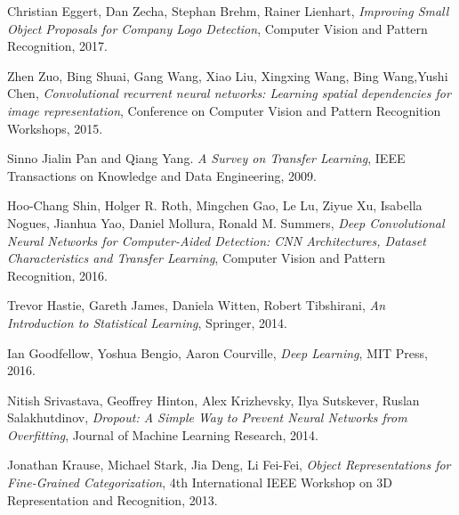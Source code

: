 \documentclass [11pt,letterpaper ,twoside ,openany ]{report}
\begin{document}
\begin{thebibliography}{9}
          Christian Eggert, Dan Zecha, Stephan Brehm, Rainer Lienhart,
          \textit{Improving Small Object Proposals for Company Logo Detection},
          Computer Vision and Pattern Recognition,
          2017.                              

          Zhen Zuo, Bing Shuai, Gang Wang, Xiao Liu, Xingxing Wang, Bing Wang,Yushi Chen,
          \textit{Convolutional recurrent neural networks: Learning spatial dependencies for image representation},
          Conference on Computer Vision and Pattern Recognition Workshops,
          2015.                                        

          Sinno Jialin Pan and Qiang Yang.
          \textit{A Survey on Transfer Learning},
          IEEE Transactions on Knowledge and Data Engineering,
          2009.                                                  

          Hoo-Chang Shin, Holger R. Roth, Mingchen Gao, Le Lu, Ziyue Xu, Isabella Nogues, Jianhua Yao, Daniel Mollura, Ronald M. Summers,
          \textit{Deep Convolutional Neural Networks for Computer-Aided Detection: CNN Architectures, Dataset Characteristics and Transfer Learning},
          Computer Vision and Pattern Recognition,
          2016.                              

          Trevor Hastie, Gareth James, Daniela Witten, Robert Tibshirani,
          \textit{An Introduction to Statistical Learning},
          Springer,
          2014.                                        

          Ian Goodfellow, Yoshua Bengio, Aaron Courville,
          \textit{Deep Learning},
          MIT Press,
          2016.                                        
           
          Nitish Srivastava, Geoffrey Hinton, Alex Krizhevsky, Ilya Sutskever, Ruslan Salakhutdinov,
          \textit{Dropout: A Simple Way to Prevent Neural Networks from Overfitting},
          Journal of Machine Learning Research,
          2014.                               

           Jonathan Krause, Michael Stark, Jia Deng, Li Fei-Fei,
          \textit{Object Representations for Fine-Grained Categorization},
          4th International IEEE Workshop on  3D Representation and Recognition,
          2013.                                         


\end{thebibliography}
\end{document}
